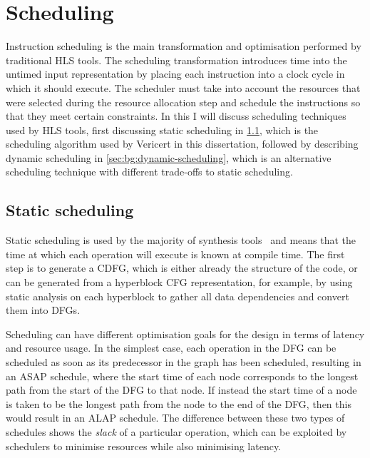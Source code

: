 \section{Scheduling}%
\label{sec:bg:scheduling}

Instruction scheduling is the main transformation and optimisation performed by
traditional \gls{HLS} tools.  The scheduling transformation introduces time into
the untimed input representation by placing each instruction into a clock cycle
in which it should execute.  The scheduler must take into account the resources
that were selected during the resource allocation step and schedule the
instructions so that they meet certain constraints.  In this
 I will discuss scheduling techniques used by
\gls{HLS} tools, first discussing static scheduling in
\cref{sec:bg:static-scheduling}, which is the scheduling algorithm used by
Vericert in this dissertation, followed by describing \gls{dynamic scheduling}
in \cref{sec:bg:dynamic-scheduling}, which is an alternative scheduling
technique with different trade-offs to static scheduling.

\subsection{Static scheduling}%
\label{sec:bg:static-scheduling}

Static scheduling is used by the majority of synthesis tools~\cite{canis13_l,
  amd23_vitis_high_synth, mentor20_catap_high_level_synth,
  intel20_sdk_openc_applic, roane23_autom_hw_sw_co_desig} and means that the
time at which each operation will execute is known at compile time.  The first
step is to generate a \gls{CDFG}, which is either already the structure of the
code, or can be generated from a \gls{hyperblock} \gls{CFG} representation, for
example, by using static analysis on each \gls{hyperblock} to gather all data
dependencies and convert them into \glspl{DFG}.

Scheduling can have different optimisation goals for the design in terms of
latency and resource usage.  In the simplest case, each operation in the
\gls{DFG} can be scheduled as soon as its predecessor in the graph has been
scheduled, resulting in an \gls{ASAP} schedule, where the start time of each
node corresponds to the longest path from the start of the \gls{DFG} to that
node.  If instead the start time of a node is taken to be the longest path from
the node to the end of the \gls{DFG}, then this would result in an \gls{ALAP}
schedule.  The difference between these two types of schedules shows the
\emph{slack} of a particular operation, which can be exploited by schedulers to
minimise resources while also minimising latency.

